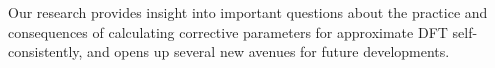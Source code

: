 {
Our research provides insight into important questions 
about the practice and consequences 
of calculating corrective parameters 
for approximate DFT self-consistently, 
and opens up several new avenues 
for future developments.}

%
%
%

